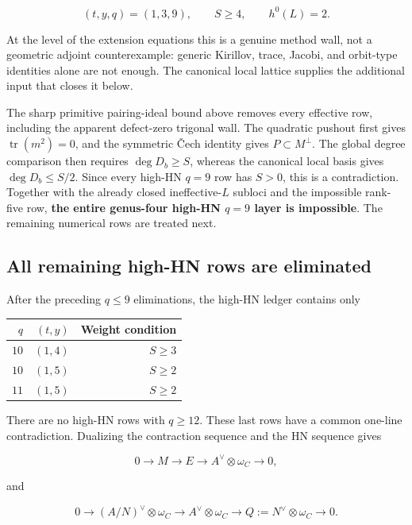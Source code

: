 \documentclass[11pt]{article}
\theoremstyle{definition}
\begin{document}
\[(t,y,q)=(1,3,9),\qquad S\ge4,\qquad h^0(L)=2.\]

At the level of the extension equations this is a genuine method wall,
not a geometric adjoint counterexample: generic Kirillov, trace, Jacobi,
and orbit-type identities alone are not enough. The canonical local
lattice supplies the additional input that closes it below.

The sharp primitive pairing-ideal bound above removes every effective
row, including the apparent defect-zero trigonal wall. The quadratic
pushout first gives \(\operatorname{tr}(m^2)=0\), and the symmetric \v{C}ech
identity gives \(P\subset M^\perp\). The global degree comparison then
requires \(\deg D_b\ge S\), whereas the canonical local basis gives
\(\deg D_b\le S/2\). Since every high-HN \(q=9\) row has \(S>0\), this
is a contradiction. Together with the already closed ineffective-\(L\)
subloci and the impossible rank-five row, \textbf{the entire genus-four
high-HN \(q=9\) layer is impossible}. The remaining numerical rows are
treated next.

\subsection{All remaining high-HN rows are
eliminated}\label{all-remaining-high-hn-rows-are-eliminated}

After the preceding \(q\le9\) eliminations, the high-HN ledger contains
only

\begin{longtable}[]{@{}rrr@{}}
\toprule\noalign{}
\(q\) & \((t,y)\) & Weight condition \\
\midrule\noalign{}
\endhead
\bottomrule\noalign{}
\endlastfoot
\(10\) & \((1,4)\) & \(S\ge3\) \\
\(10\) & \((1,5)\) & \(S\ge2\) \\
\(11\) & \((1,5)\) & \(S\ge2\) \\
\end{longtable}

There are no high-HN rows with \(q\ge12\). These last rows have a common
one-line contradiction. Dualizing the contraction sequence and the HN
sequence gives

\[0\longrightarrow M\longrightarrow E\longrightarrow
A^\vee\otimes\omega_C\longrightarrow0,\]

and

\[0\longrightarrow(A/N)^\vee\otimes\omega_C
\longrightarrow A^\vee\otimes\omega_C
\longrightarrow Q:=N^\vee\otimes\omega_C\longrightarrow0.\]
\end{document}
